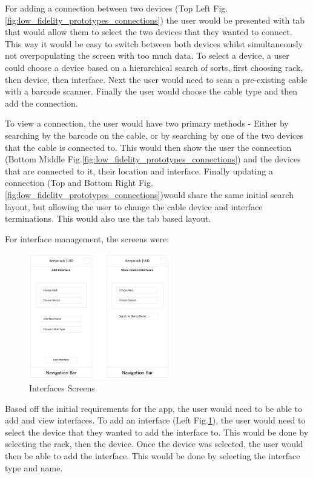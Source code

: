 \documentclass [11pt,a4paper]{article}
\begin{document}
For adding a connection between two devices (Top Left Fig.\ref{fig:low_fidelity_prototypes_connections}) the user would be presented with tab that would allow them to select the two devices that they wanted to connect. This way it would be easy to switch between both devices whilst simultaneously not overpopulating the screen with too much data. To select a device, a user could choose a device based on a hierarchical search of sorts, first choosing rack, then device, then interface. Next the user would need to scan a pre-existing cable with a barcode scanner. Finally the user would choose the cable type and then add the connection. 

To view a connection, the user would have two primary methods - Either by searching by the barcode on the cable, or by searching by one of the two devices that the cable is connected to. This would then show the user the connection (Bottom Middle Fig.\ref{fig:low_fidelity_prototypes_connections}) and the devices that are connected to it, their location and interface. Finally updating a connection (Top and Bottom Right Fig.\ref{fig:low_fidelity_prototypes_connections})would share the same initial search layout, but allowing the user to change the cable device and interface terminations. This would also use the tab based layout. 

For interface management, the screens were:
\begin{figure}[H]
    \centering
    \includegraphics[width=0.55\textwidth]{images/initial_prototype_interfaces.png}
    \caption{Interfaces Screens}
    \label{fig:low_fidelity_prototypes_interfaces}
\end{figure}

Based off the initial requirements for the app, the user would need to be able to add and view interfaces. To add an interface (Left Fig.\ref{fig:low_fidelity_prototypes_interfaces}), the user would need to select the device that they wanted to add the interface to. This would be done by selecting the rack, then the device. Once the device was selected, the user would then be able to add the interface. This would be done by selecting the interface type and name. 
\end{document}
